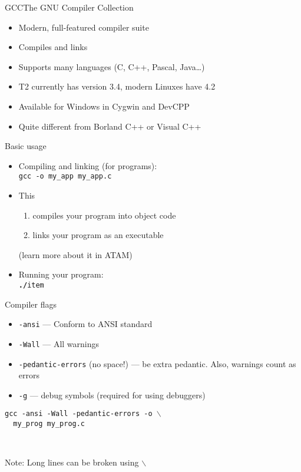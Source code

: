 \documentclass{beamer}
\begin{document}
\begin{frame}{GCC}{The GNU Compiler Collection}
  \begin{itemize}
    \item Modern, full-featured compiler suite
    \item Compiles and links
    \item Supports many languages (C, C++, Pascal, Java\ldots)
    \item T2 currently has version 3.4, modern Linuxes have 4.2
    \item Available for Windows in Cygwin and DevCPP
      \pause
    \item Quite different from Borland C++ or Visual C++
  \end{itemize}
\end{frame}

\begin{frame}{Basic usage}
  \begin{itemize}
    \item Compiling and linking (for programs):\\
      \texttt{gcc -o my\_app my\_app.c} \\
    \item This
      \begin{enumerate}
        \item compiles your program into object code
        \item links your program as an executable
      \end{enumerate}
      (learn more about it in ATAM)
    \item Running your program:\\
      \texttt{\textbf{./}item}
  \end{itemize}
\end{frame}

\begin{frame}{Compiler flags}
  \begin{itemize}
    \item \texttt{-ansi} --- Conform to ANSI standard
    \item \texttt{-Wall} --- All warnings
    \item \texttt{-pedantic-errors} (no space!) --- be extra pedantic. Also,
      warnings count as errors
    \item \texttt{-g} --- debug symbols (required for using debuggers)
  \end{itemize}

  \texttt{gcc -ansi -Wall -pedantic-errors -o $\backslash$ \\
  ~~my\_prog my\_prog.c}

~

{\tiny Note: Long lines can be broken using $\backslash$}
\end{frame}
\end{document}
